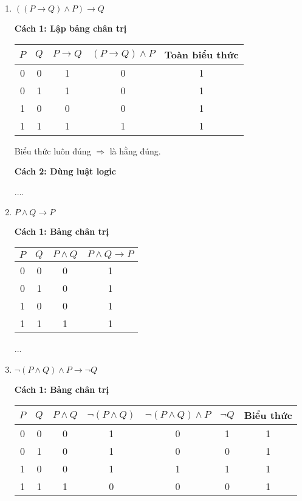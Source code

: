 \documentclass[11pt, oneside,openright,a4paper]{book}
\begin{document}
\begin{enumerate}
    \item \(((P \rightarrow Q) \land P) \rightarrow Q\)

    \textbf{Cách 1: Lập bảng chân trị}

    \begin{center}
    \begin{tabular}{|c|c|c|c|c|}
        \hline
        $P$ & $Q$ & $P \rightarrow Q$ & $(P \rightarrow Q) \land P$ & Toàn biểu thức \\
        \hline
        0 & 0 & 1 & 0 & 1 \\
        0 & 1 & 1 & 0 & 1 \\
        1 & 0 & 0 & 0 & 1 \\
        1 & 1 & 1 & 1 & 1 \\
        \hline
    \end{tabular}
    \end{center}

    Biểu thức luôn đúng $\Rightarrow$ là hằng đúng.

    \textbf{Cách 2: Dùng luật logic}

....

    \bigskip

    \item $P \land Q \rightarrow P$

    \textbf{Cách 1: Bảng chân trị}

    \begin{center}
    \begin{tabular}{|c|c|c|c|}
        \hline
        $P$ & $Q$ & $P \land Q$ & $P \land Q \rightarrow P$ \\
        \hline
        0 & 0 & 0 & 1 \\
        0 & 1 & 0 & 1 \\
        1 & 0 & 0 & 1 \\
        1 & 1 & 1 & 1 \\
        \hline
    \end{tabular}
    \end{center}

...

    \bigskip

    \item $\neg(P \land Q) \land P \rightarrow \neg Q$

    \textbf{Cách 1: Bảng chân trị}

    \begin{center}
    \begin{tabular}{|c|c|c|c|c|c|c|}
        \hline
        $P$ & $Q$ & $P \land Q$ & $\neg(P \land Q)$ & $\neg(P \land Q) \land P$ & $\neg Q$ & Biểu thức \\
        \hline
        0 & 0 & 0 & 1 & 0 & 1 & 1 \\
        0 & 1 & 0 & 1 & 0 & 0 & 1 \\
        1 & 0 & 0 & 1 & 1 & 1 & 1 \\
        1 & 1 & 1 & 0 & 0 & 0 & 1 \\
        \hline
    \end{tabular}
    \end{center}


\end{enumerate}
\end{document}
